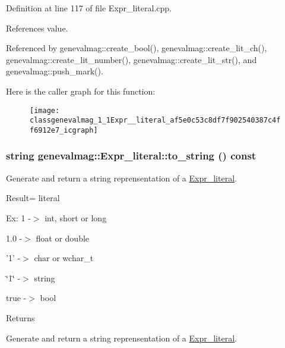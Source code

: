 Definition at line 117 of file Expr\_\-literal.cpp.



References value.



Referenced by genevalmag::create\_\-bool(), genevalmag::create\_\-lit\_\-ch(), genevalmag::create\_\-lit\_\-number(), genevalmag::create\_\-lit\_\-str(), and genevalmag::push\_\-mark().



Here is the caller graph for this function:\nopagebreak
\begin{figure}[H]
\begin{center}
\leavevmode
\texttt{[image: classgenevalmag\_1\_1Expr\_\_literal\_af5e0c53c8df7f902540387c4ff6912e7\_icgraph]}
\end{center}
\end{figure}


\hypertarget{classgenevalmag_1_1Expr__literal_a2e023f432f0a46b75f65cb0e36ac6583}{
\subsubsection[{to\_\-string}]{\setlength{\rightskip}{0pt plus 5cm}string genevalmag::Expr\_\-literal::to\_\-string () const}}
\label{classgenevalmag_1_1Expr__literal_a2e023f432f0a46b75f65cb0e36ac6583}
Generate and return a string reprensentation of a \hyperlink{classgenevalmag_1_1Expr__literal}{Expr\_\-literal}.\par
 \par
 Result= literal\par
 \par
 Ex: 1 -\/$>$ int, short or long\par
 1.0 -\/$>$ float or double\par
 '1' -\/$>$ char or wchar\_\-t\par
 \char`\"{}1\char`\"{} -\/$>$ string\par
 true -\/$>$ bool\par
 \begin{DoxyReturn}{Returns}

\end{DoxyReturn}
Generate and return a string reprensentation of a \hyperlink{classgenevalmag_1_1Expr__literal}{Expr\_\-literal}.

